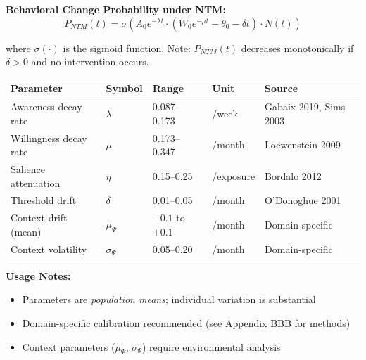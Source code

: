 \documentclass[11pt, a4paper]{article}
\begin{document}
\begin{tcolorbox}[colback=white, colframe=black!75!black,
    title=\textbf{Mathematical Derivation: NTM Decay Functions}]
\textbf{Behavioral Change Probability under NTM:}
\begin{equation}
P_{NTM}(t) = \sigma\left( A_0 e^{-\lambda t} \cdot (W_0 e^{-\mu t} - \theta_0 - \delta t) \cdot N(t) \right)
\label{eq:p-ntm}
\end{equation}

where $\sigma(\cdot)$ is the sigmoid function. Note: $P_{NTM}(t)$ decreases monotonically if $\delta > 0$ and no intervention occurs.

\end{tcolorbox}

\begin{tcolorbox}[colback=gray!5!white, colframe=gray!75!black,
    title=\textbf{Parameter Reference Table: Empirical Ranges}]

\begin{center}
\renewcommand{\arraystretch}{1.3}
\begin{tabular}{@{}lllll@{}}
\toprule
\textbf{Parameter} & \textbf{Symbol} & \textbf{Range} & \textbf{Unit} & \textbf{Source} \\
\midrule
Awareness decay rate & $\lambda$ & 0.087--0.173 & /week & Gabaix 2019, Sims 2003 \\
Willingness decay rate & $\mu$ & 0.173--0.347 & /month & Loewenstein 2009 \\
Salience attenuation & $\eta$ & 0.15--0.25 & /exposure & Bordalo 2012 \\
Threshold drift & $\delta$ & 0.01--0.05 & /month & O'Donoghue 2001 \\
Context drift (mean) & $\mu_\Psi$ & $-0.1$ to $+0.1$ & /month & Domain-specific \\
Context volatility & $\sigma_\Psi$ & 0.05--0.20 & /month & Domain-specific \\
\bottomrule
\end{tabular}
\end{center}

\textbf{Usage Notes:}
\begin{itemize}[nosep]
\item Parameters are \textit{population means}; individual variation is substantial
\item Domain-specific calibration recommended (see Appendix BBB for methods)
\item Context parameters ($\mu_\Psi$, $\sigma_\Psi$) require environmental analysis
\end{itemize}

\end{tcolorbox}
\end{document}
